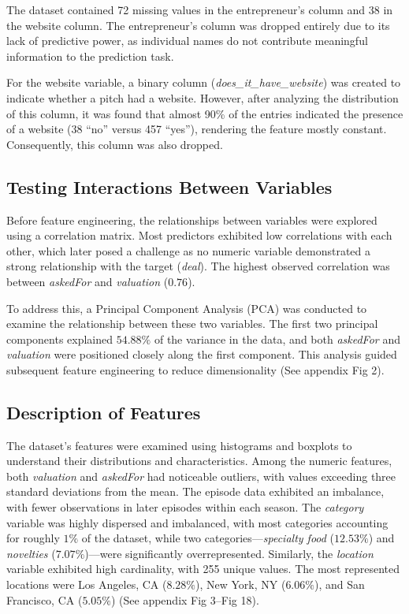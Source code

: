 \documentclass{article}
\begin{document}
The dataset contained 72 missing values in the entrepreneur’s column and 38 in the website column. The entrepreneur’s column was dropped entirely due to its lack of predictive power, as individual names do not contribute meaningful information to the prediction task.

For the website variable, a binary column (\textit{does\_it\_have\_website}) was created to indicate whether a pitch had a website. However, after analyzing the distribution of this column, it was found that almost 90\% of the entries indicated the presence of a website (38 ``no'' versus 457 ``yes''), rendering the feature mostly constant. Consequently, this column was also dropped.

\subsection{Testing Interactions Between Variables}

Before feature engineering, the relationships between variables were explored using a correlation matrix. Most predictors exhibited low correlations with each other, which later posed a challenge as no numeric variable demonstrated a strong relationship with the target (\textit{deal}). The highest observed correlation was between \textit{askedFor} and \textit{valuation} ($0.76$).

To address this, a Principal Component Analysis (PCA) was conducted to examine the relationship between these two variables. The first two principal components explained $54.88\%$ of the variance in the data, and both \textit{askedFor} and \textit{valuation} were positioned closely along the first component. This analysis guided subsequent feature engineering to reduce dimensionality (See appendix Fig 2).

\subsection{Description of Features}

The dataset’s features were examined using histograms and boxplots to understand their distributions and characteristics. Among the numeric features, both \textit{valuation} and \textit{askedFor} had noticeable outliers, with values exceeding three standard deviations from the mean. The episode data exhibited an imbalance, with fewer observations in later episodes within each season. The \textit{category} variable was highly dispersed and imbalanced, with most categories accounting for roughly $1\%$ of the dataset, while two categories—\textit{specialty food} ($12.53\%$) and \textit{novelties} ($7.07\%$)—were significantly overrepresented. Similarly, the \textit{location} variable exhibited high cardinality, with 255 unique values. The most represented locations were Los Angeles, CA ($8.28\%$), New York, NY ($6.06\%$), and San Francisco, CA ($5.05\%$) (See appendix Fig 3–Fig 18).
\end{document}
